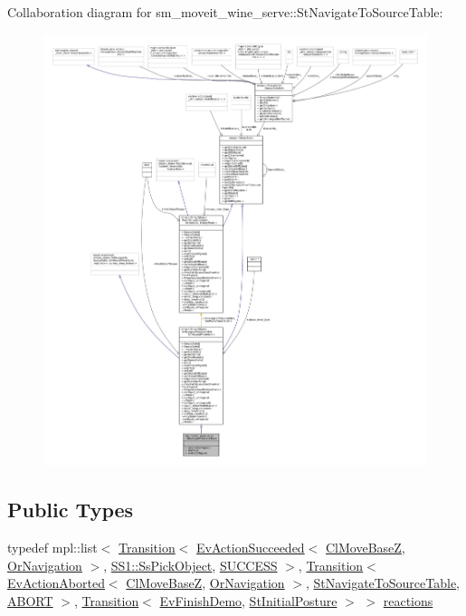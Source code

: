 Collaboration diagram for sm\+\_\+moveit\+\_\+wine\+\_\+serve\+:\+:St\+Navigate\+To\+Source\+Table\+:
\nopagebreak
\begin{figure}[H]
\begin{center}
\leavevmode
\includegraphics[width=350pt]{structsm__moveit__wine__serve_1_1StNavigateToSourceTable__coll__graph}
\end{center}
\end{figure}
\subsection*{Public Types}
\begin{DoxyCompactItemize}
\item 
typedef mpl\+::list$<$ \hyperlink{classsmacc_1_1Transition}{Transition}$<$ \hyperlink{structsmacc_1_1default__events_1_1EvActionSucceeded}{Ev\+Action\+Succeeded}$<$ \hyperlink{classcl__move__base__z_1_1ClMoveBaseZ}{Cl\+Move\+BaseZ}, \hyperlink{classsm__moveit__wine__serve_1_1OrNavigation}{Or\+Navigation} $>$, \hyperlink{structsm__moveit__wine__serve_1_1SS1_1_1SsPickObject}{S\+S1\+::\+Ss\+Pick\+Object}, \hyperlink{structsmacc_1_1default__transition__tags_1_1SUCCESS}{S\+U\+C\+C\+E\+SS} $>$, \hyperlink{classsmacc_1_1Transition}{Transition}$<$ \hyperlink{structsmacc_1_1default__events_1_1EvActionAborted}{Ev\+Action\+Aborted}$<$ \hyperlink{classcl__move__base__z_1_1ClMoveBaseZ}{Cl\+Move\+BaseZ}, \hyperlink{classsm__moveit__wine__serve_1_1OrNavigation}{Or\+Navigation} $>$, \hyperlink{structsm__moveit__wine__serve_1_1StNavigateToSourceTable}{St\+Navigate\+To\+Source\+Table}, \hyperlink{structsmacc_1_1default__transition__tags_1_1ABORT}{A\+B\+O\+RT} $>$, \hyperlink{classsmacc_1_1Transition}{Transition}$<$ \hyperlink{structsm__moveit__wine__serve_1_1EvFinishDemo}{Ev\+Finish\+Demo}, \hyperlink{structsm__moveit__wine__serve_1_1StInitialPosture}{St\+Initial\+Posture} $>$ $>$ \hyperlink{structsm__moveit__wine__serve_1_1StNavigateToSourceTable_a702d1b8ac0b9b136de13a79bbe9442a0}{reactions}
\end{DoxyCompactItemize}
